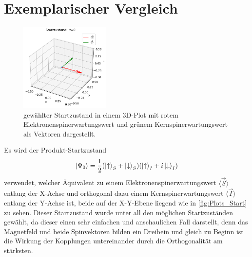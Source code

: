 \section{Exemplarischer Vergleich}
\begin{figure}
    \centering
    \includegraphics[width = 0.4\textwidth]{Abbildungen/Plot_Vektor_Start.png}
    \caption{gewählter Startzustand in einem 3D-Plot mit rotem Elektronenspinerwartungswert und grünem Kernspinerwartungswert als Vektoren dargestellt.}
    \label{fig:Plots_Start}
\end{figure}
Es wird der Produkt-Startzustand 
\begin{align}
    \ket{\Psi_0}=\frac{1}{2}(\ket{\uparrow}_S + \ket{\downarrow}_S)(\ket{\uparrow}_I + i\ket{\downarrow}_I)
\end{align}
verwendet, welcher Äquivalent zu einem Elektronenspinerwartungswert $\langle\vec{S}\rangle$ entlang der X-Achse und orthogonal
dazu einem Kernspinerwartungswert $\langle\vec{I}\rangle$ entlang der Y-Achse ist, beide auf der X-Y-Ebene liegend wie in \autoref{fig:Plots_Start} zu sehen.
Dieser Startzustand wurde unter all den möglichen Startzuständen gewählt, da dieser einen sehr einfachen und anschaulichen Fall darstellt, denn das Magnetfeld und beide Spinvektoren 
bilden ein Dreibein und gleich zu Beginn ist die Wirkung der Kopplungen untereinander durch die Orthogonalität am stärksten.

